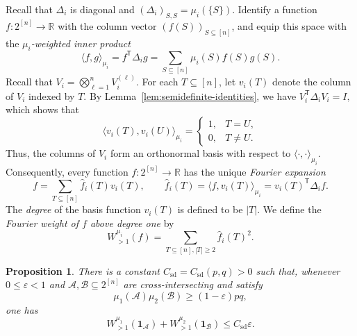 \documentclass[11pt]{article}
\numberwithin{equation}{section}
\newtheorem{proposition}[theorem]{Proposition}
\theoremstyle{definition}
\theoremstyle{remark}
\begin{document}
Recall that $\Delta_i$ is diagonal and
$
 (\Delta_i)_{S,S}
 =
 \mu_i(\{S\}).
$
Identify a function $f:2^{[n]}\to\mathbb R$ with the column vector
$(f(S))_{S\subseteq[n]}$, and equip this space with the
\textit{$\mu_i$-weighted inner product}
$$
 \langle f,g\rangle_{\mu_i}
 =
 f^{\mathsf T}\Delta_i g
 =
 \sum_{S\subseteq[n]}\mu_i(S)f(S)g(S).
$$
Recall that
$
 V_i=\bigotimes_{\ell=1}^nV_i^{(\ell)}.
$
For each $T\subseteq[n]$, let $v_i(T)$ denote the column of $V_i$
indexed by $T$. By Lemma~\ref{lem:semidefinite-identities}, we have
$
 V_i^{\mathsf T}\Delta_iV_i=I,
$
which shows that
$$
 \langle v_i(T),v_i(U)\rangle_{\mu_i}
 =
 \begin{cases}
  1,&T=U,\\
  0,&T\neq U.
 \end{cases}
$$
Thus, the columns of $V_i$ form an orthonormal basis with respect to
$\langle\cdot,\cdot\rangle_{\mu_i}$. Consequently, every function
$f:2^{[n]}\to\mathbb R$ has the unique \textit{Fourier expansion}
$$
 f
 =
 \sum_{T\subseteq[n]}\widehat f_i(T)v_i(T),
 \qquad
 \widehat f_i(T)
 =
 \langle f,v_i(T)\rangle_{\mu_i}
 =
 v_i(T)^{\mathsf T}\Delta_i f.
$$
The \textit{degree} of the basis function $v_i(T)$ is defined to be $|T|$.
We define the \textit{Fourier weight of $f$ above degree one} by
$$
 W_{>1}^{\mu_i}(f)
 =
 \sum_{T\subseteq[n], |T|\geq2}
 \widehat f_i(T)^2.
$$

\begin{proposition}\label{prop:higher-degree-estimate}
There is a constant $C_{\mathrm{sd}}=C_{\mathrm{sd}}(p,q)>0$ such
that, whenever $0\leq\varepsilon<1$ and
$\mathcal A,\mathcal B\subseteq 2^{[n]}$ are cross-intersecting and satisfy
$$
 \mu_1(\mathcal A)\mu_2(\mathcal B)
 \geq(1-\varepsilon)pq,
$$
one has
\begin{equation}
 W_{>1}^{\mu_1}(\mathbf 1_{\mathcal A})
 +
 W_{>1}^{\mu_2}(\mathbf 1_{\mathcal B})
 \leq C_{\mathrm{sd}}\varepsilon.
 \label{eq:stability-high-degree}
\end{equation}
\end{proposition}
\end{document}
